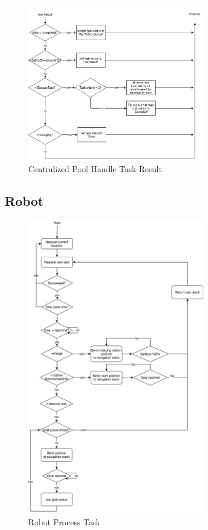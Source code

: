 \begin{figure}[htbp]
    \centering
    \includegraphics[width = 0.7\textwidth]{content/images/ch4/centralized_task_result.drawio.png}
    \caption{Centralized Pool Handle Task Result}
    \label{fig:centralized_task_handle}
\end{figure}


\subsection{Robot}

\begin{figure}[htbp]
    \centering
    \includegraphics[width = 0.7\textwidth]{content/images/ch4/robot_process_task.drawio.png}
    \caption{Robot Process Task }
    \label{fig:task_process_robot}
\end{figure}

